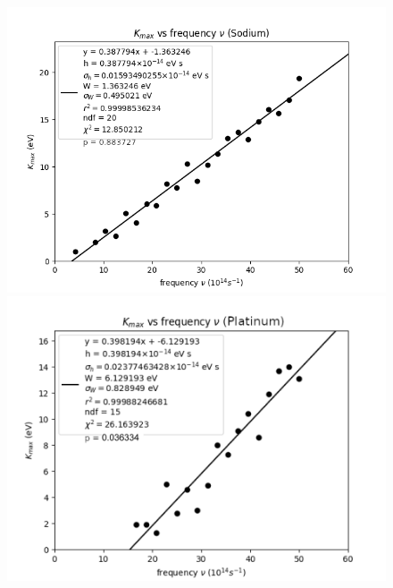\documentclass{article}
\begin{document}
\begin{itemize}
  \begin{figure}[ht!]
    \centering
    \begin{minipage}[b]{0.45\textwidth}
      \includegraphics[width=\textwidth]{sodium_plot_1.png}
    \end{minipage}
  \hfill
    \begin{minipage}[b]{0.45\textwidth}
      \includegraphics[width=\textwidth]{platinum_plot_1.png}
    \end{minipage}
  \end{figure}
  

\end{itemize}
\end{document}
